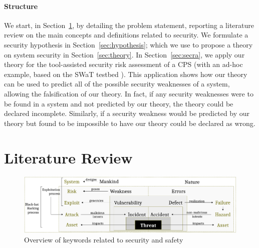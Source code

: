 \documentclass[conference]{IEEEtran}
\begin{document}
\paragraph{Structure} We start, in
Section~\ref{sec:literature}, by detailing the problem statement, reporting a
literature review on the main concepts and definitions related to security.  We
formulate a security hypothesis in Section~\ref{sec:hypothesis}; which we use
to propose a theory on system security in Section~\ref{sec:theory}. In
Section~\ref{sec:secra}, we apply our theory for the tool-assisted security
risk assessment of a CPS (with an ad-hoc example, based on the SWaT testbed
\cite{Mathur2016swat}).  This application shows how our theory can be used to
predict all of the possible security weaknesses of a system, allowing the
falsification of our theory.  In fact, if any security weaknesses were to be
found in a system and not predicted by our theory, the theory could be declared
incomplete.  Similarly, if a security weakness would be predicted by our theory
but found to be impossible to have our theory could be declared as wrong.

\section{Literature Review}\label{sec:literature}
\begin{figure}[t]
	\centering
	\includegraphics[width=.9\textwidth]{safety-security_3.pdf}
	\caption{Overview of keywords related to security and safety}
	\label{fig:safety-security}
\end{figure}
\end{document}
